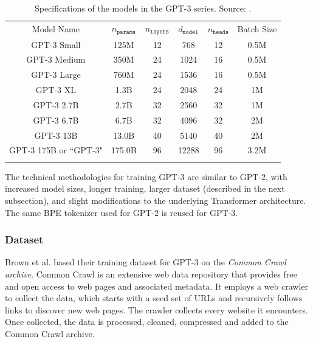 \documentclass{article}
\begin{document}
\begin{table}[ht!]
    \begin{center}
        \begin{tabular}{c c c c c c}
            \hline
            \addlinespace
            Model Name & $n_{\texttt{params}}$ & $n_{\texttt{layers}}$ & $d_{\texttt{model}}$ & $n_{\texttt{heads}}$ & Batch Size \\
            \addlinespace
            \hline
            \addlinespace
            GPT-3 Small & 125M & 12 & 768 & 12 & 0.5M \\
            GPT-3 Medium & 350M & 24 & 1024 & 16 & 0.5M \\
            GPT-3 Large & 760M & 24 & 1536 & 16 & 0.5M \\
            GPT-3 XL & 1.3B & 24 & 2048 & 24 & 1M \\
            GPT-3 2.7B & 2.7B & 32 &2560 &32 & 1M \\
            GPT-3 6.7B & 6.7B & 32 & 4096 & 32 & 2M \\
            GPT-3 13B & 13.0B & 40 & 5140 & 40 & 2M \\
            GPT-3 175B or ``GPT-3" & 175.0B & 96 & 12288 & 96 & 3.2M \\
            \addlinespace
            \hline
        \end{tabular}
        \caption{
            Specifications of the models in the GPT-3 series. Source: \citet{brown2020gpt3}.
        }
        \label{tab:gpt3_tab2_1}
        \vspace{-6mm}
    \end{center}
\end{table}

\medskip
\noindent
The technical methodologies for training GPT-3 are similar to GPT-2, with increased model sizes, longer training, larger dataset (described in the next subsection), and slight modifications to the underlying Transformer architecture. The same BPE tokenizer used for GPT-2 is reused for GPT-3.


\subsubsection{Dataset}
\label{subsec:gpt3-dataset}

Brown et al. based their training dataset for GPT-3 on the \emph{Common Crawl archive}. Common Crawl is an extensive web data repository that provides free and open access to web pages and associated metadata. It employs a web crawler to collect the data, which starts with a seed set of URLs and recursively follows links to discover new web pages. The crawler collects every website it encounters. Once collected, the data is processed, cleaned, compressed and added to the Common Crawl archive.
\end{document}
